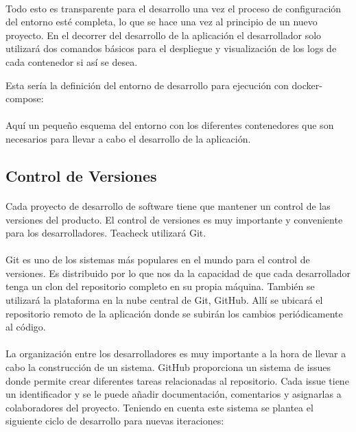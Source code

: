 \paragraph{}
Todo esto es transparente para el desarrollo una vez el proceso de configuración del entorno esté completa, lo que se hace una vez al principio de un nuevo proyecto. En el decorrer del desarrollo de la aplicación el desarrollador solo utilizará dos comandos básicos para el despliegue y visualización de los logs de cada contenedor si así se desea.

Esta sería la definición del entorno de desarrollo para ejecución con docker-compose:


\paragraph{}
Aquí un pequeño esquema del entorno con los diferentes contenedores que son necesarios para llevar a cabo el desarrollo de la aplicación.

\subsection{Control de Versiones}
\paragraph{}
Cada proyecto de desarrollo de software tiene que mantener un control de las versiones del producto. El control de versiones es muy importante y conveniente para los desarrolladores.
Teacheck utilizará Git. 

\paragraph{}
Git es uno de los sistemas más populares en el mundo para el control de versiones. Es distribuido por lo que nos da la capacidad de que cada desarrollador tenga un clon del repositorio completo en su propia máquina. También se utilizará la plataforma en la nube central de Git, GitHub. Allí se ubicará el repositorio remoto de la aplicación donde se subirán los cambios periódicamente al código.

\paragraph{}
La organización entre los desarrolladores es muy importante a la hora de llevar a cabo la construcción de un sistema. GitHub proporciona un sistema de issues donde permite crear diferentes tareas relacionadas al repositorio. Cada issue tiene un identificador y se le puede añadir documentación, comentarios y asignarlas a colaboradores del proyecto. Teniendo en cuenta este sistema se plantea el siguiente ciclo de desarrollo para nuevas iteraciones:

